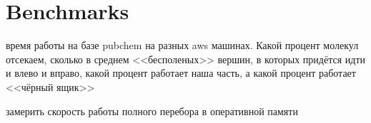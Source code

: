 \section{Benchmarks}

{\color{red} время работы на базе pubchem на разных aws машинах. Какой процент молекул отсекаем, сколько в среднем <<бесполеных>> вершин, в которых придётся идти и влево и вправо, какой процент работает наша часть, а какой процент работает <<чёрный ящик>>}

{\color{red} замерить скорость работы полного перебора в оперативной памяти}
